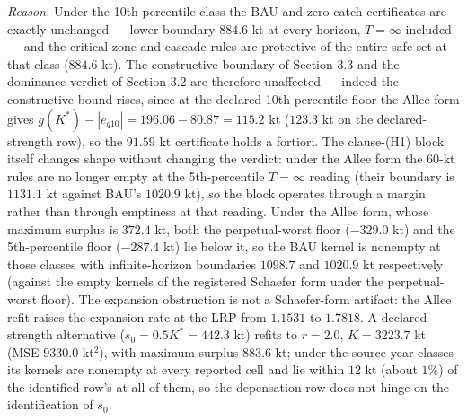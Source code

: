 \documentclass[11pt]{article}
\begin{document}
\emph{Reason.} Under the 10th-percentile class the BAU and zero-catch
certificates are exactly unchanged --- lower boundary \(884.6\) kt at
every horizon, \(T=\infty\) included --- and the critical-zone and
cascade rules are protective of the entire safe set at that class
(\(884.6\) kt). The constructive boundary of Section 3.3 and the
dominance verdict of Section 3.2 are therefore unaffected --- indeed the
constructive bound rises, since at the declared 10th-percentile floor the
Allee form gives \(g(K^*) - |e_{q10}| = 196.06 - 80.87 = 115.2\) kt
(\(123.3\) kt on the declared-strength row), so the \(91.59\) kt
certificate holds a fortiori. The clause-(H1) block itself changes shape without changing the verdict:
under the Allee form the 60-kt rules are no longer empty at the
5th-percentile \(T=\infty\) reading (their boundary is \(1131.1\) kt
against BAU's \(1020.9\) kt), so the block operates through a margin
rather than through emptiness at that reading. Under the
Allee form, whose maximum surplus is \(372.4\) kt, both the
perpetual-worst floor (\(-329.0\) kt) and the 5th-percentile floor
(\(-287.4\) kt) lie below it, so the BAU kernel is nonempty at those
classes with infinite-horizon boundaries \(1098.7\) and \(1020.9\) kt
respectively (against the empty kernels of the registered Schaefer form
under the perpetual-worst floor). The expansion obstruction is not a
Schaefer-form artifact: the Allee refit raises the expansion rate at the
LRP from \(1.1531\) to \(1.7818\). A declared-strength alternative
(\(s_0 = 0.5K^* = 442.3\) kt) refits to \(r = 2.0\), \(K = 3223.7\) kt
(MSE \(9330.0\) kt\(^2\)), with maximum surplus \(883.6\) kt; under the
source-year classes its kernels are nonempty at every reported cell and
lie within \(12\) kt (about \(1\%\)) of the identified row's at all of
them, so the depensation row does not hinge on the identification of
\(s_0\).
\end{document}
